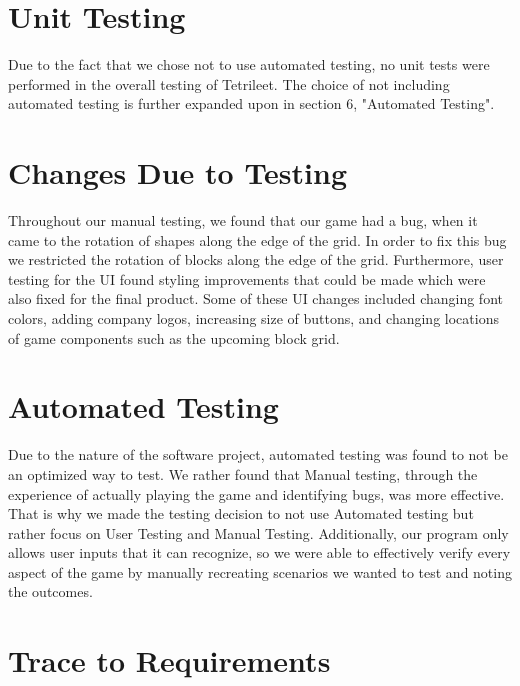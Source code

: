 \documentclass[12pt, titlepage]{article}
\begin{document}
\section{Unit Testing}

Due to the fact that we chose not to use automated testing, no unit tests were performed in the overall testing of Tetrileet. The choice of not including automated testing is further expanded upon in section 6, "Automated Testing".

\section{Changes Due to Testing}
Throughout our manual testing, we found that our game had a bug, when it came to the rotation of shapes along the edge of the grid. In order to fix this bug we restricted the rotation of blocks along the edge of the grid. Furthermore, user testing for the UI found styling improvements that could be made which were also fixed for the final product. Some of these UI changes included changing font colors, adding company logos, increasing size of buttons, and changing locations of game components such as the  upcoming block grid.  
\section{Automated Testing}
Due to the nature of the software project, automated testing was found to not be an optimized way to test. We rather found that Manual testing, through the experience of actually playing the game and identifying bugs, was more effective. That is why we made the testing decision to not use Automated testing but rather focus on User Testing and Manual Testing. Additionally, our program only allows user inputs that it can recognize, so we were able to effectively verify every aspect of the game by manually recreating scenarios we wanted to test and noting the outcomes.


\section{Trace to Requirements}
		
\end{document}
